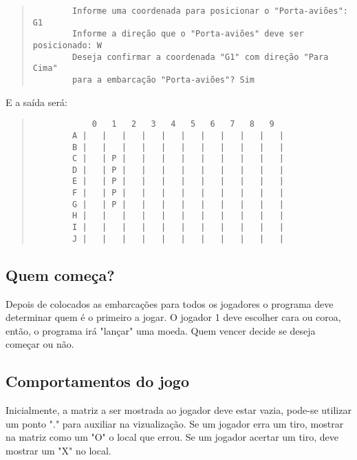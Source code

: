 \documentclass[defesa,oneside]{ppginf}
\begin{document}
\begin{quote}
	\begin{footnotesize}
		\begin{verbatim}
		Informe uma coordenada para posicionar o "Porta-aviões": G1
		Informe a direção que o "Porta-aviões" deve ser posicionado: W
		Deseja confirmar a coordenada "G1" com direção "Para Cima" 
		para a embarcação "Porta-aviões"? Sim
		\end{verbatim}		
	\end{footnotesize}
\end{quote}

E a saída será:

\begin{quote}
	\begin{footnotesize}
		\begin{verbatim}
		    0   1   2   3   4   5   6   7   8   9
		A |   |   |   |   |   |   |   |   |   |   |
		B |   |   |   |   |   |   |   |   |   |   |
		C |   | P |   |   |   |   |   |   |   |   |
		D |   | P |   |   |   |   |   |   |   |   |
		E |   | P |   |   |   |   |   |   |   |   |
		F |   | P |   |   |   |   |   |   |   |   |
		G |   | P |   |   |   |   |   |   |   |   |
		H |   |   |   |   |   |   |   |   |   |   |
		I |   |   |   |   |   |   |   |   |   |   |
		J |   |   |   |   |   |   |   |   |   |   |
		\end{verbatim}		
	\end{footnotesize}
\end{quote}

\subsection{Quem começa?}

Depois de colocados as embarcações para todos os jogadores o programa deve determinar quem é o primeiro a jogar. O jogador 1 deve escolher cara ou coroa, então, o programa irá "lançar" uma moeda. Quem vencer decide se deseja começar ou não.

\subsection{Comportamentos do jogo}

Inicialmente, a matriz a ser mostrada ao jogador deve estar vazia, pode-se utilizar um ponto "." para auxiliar na vizualização. Se um jogador erra um tiro, mostrar na matriz como um "O" o local que errou. Se um jogador acertar um tiro, deve mostrar um "X" no local. 
\end{document}

